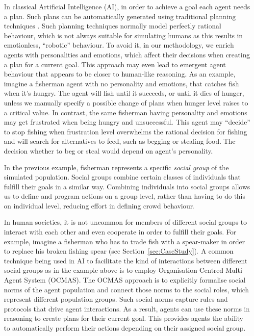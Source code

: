 \documentclass[graybox]{svmult}
\begin{document}
In classical Artificial Intelligence (AI), in order to achieve a goal each agent needs a plan. Such plans can be automatically generated using traditional planning techniques \cite{shehory1999} \cite{braubach2005}. Such planning techniques normally model perfectly rational behaviour, which is not always suitable for simulating humans as this results in emotionless, ``robotic'' behaviour. To avoid it, in our methodology, we enrich agents with personalities and emotions, which affect their decisions when creating a plan for a current goal. This approach may even lead to emergent agent behaviour that appears to be closer to human-like reasoning. As an example, imagine a fisherman agent with no personality and emotions, that catches fish when it's hungry. The agent will fish until it succeeds, or until it dies of hunger, unless we manually specify a possible change of plans when hunger level raises to a critical value. In contrast, the same fisherman having personality and emotions may get frustrated when being hungry and unsuccessful. This agent may ``decide'' to stop fishing when frustration level overwhelms the rational decision for fishing and will search for alternatives to feed, such as begging or stealing food. The decision whether to beg or steal would depend on agent's personality.

In the previous example, fisherman represents a specific \textit{social group} of the simulated population. Social groups combine certain classes of individuals that fulfill their goals in a similar way. Combining individuals into social groups allows us to define and program actions on a group level, rather than having to do this on individual level, reducing effort in defining crowd behaviour. 

In human societies, it is not uncommon for members of different social groups to interact with each other and even cooperate in order to fulfill their goals. For example, imagine a fisherman who has to trade fish with a spear-maker in order to replace his broken fishing spear (see Section~\ref{sec:CaseStudy}). A common technique being used in AI to facilitate the kind of interactions between different social groups as in the example above is to employ Organisation-Centred Multi-Agent System (OCMAS). The OCMAS approach is to explicitly formalise social norms of the agent population and connect those norms to the social roles, which represent different population groups. Such social norms capture rules and protocols that drive agent interactions. As a result, agents can use these norms in reasoning to create plans for their current goal. This provides agents the ability to automatically perform their actions depending on their assigned social group.
\end{document}
